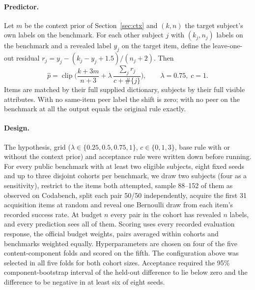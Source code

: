 \documentclass{article}
\begin{document}
\paragraph{Predictor.} Let $m$ be the context prior of Section~\ref{sec:ctx} and $(k,n)$ the
target subject's own labels on the benchmark. For each other subject $j$ with
$(k_j,n_j)$ labels on the benchmark and a revealed label $y_{j}$ on the target
item, define the leave-one-out residual $r_j=y_j-(k_j-y_j+1.5)/(n_j+2)$. Then
\begin{equation}
 \widehat p=\operatorname{clip}\Big(\frac{k+3m}{n+3}+\lambda\,
 \frac{\sum_j r_j}{c+\#\{j\}}\Big),\qquad \lambda=0.75,\; c=1 .
\end{equation}
Items are matched by their full supplied dictionary, subjects by their full
visible attributes. With no same-item peer label the shift is zero; with no
peer on the benchmark at all the output equals the original rule exactly.

\paragraph{Design.} The hypothesis, grid ($\lambda\in\{0.25,0.5,0.75,1\}$,
$c\in\{0,1,3\}$, base rule with or without the context prior) and acceptance rule
were written down before running. For every public benchmark with at least two
eligible subjects, eight fixed seeds and up to three disjoint cohorts per
benchmark, we draw two subjects (four as a sensitivity), restrict to the items
both attempted, sample 88--152 of them as observed on Codabench, split each pair
50/50 independently, acquire the first 31 acquisition items at random and reveal
one Bernoulli draw from each item's recorded success rate. At budget $n$ every
pair in the cohort has revealed $n$ labels, and every prediction sees all of
them. Scoring uses every recorded evaluation response, the official budget
weights, pairs averaged within cohorts and benchmarks weighted equally.
Hyperparameters are chosen on four of the five content-component folds and
scored on the fifth. The configuration above was selected in all five folds for
both cohort sizes. Acceptance required the 95\% component-bootstrap interval of
the held-out difference to lie below zero and the difference to be negative in
at least six of eight seeds.
\end{document}
